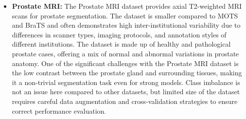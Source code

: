 \documentclass{cls/iutbscthesis}
\begin{document}
\begin{itemize}
    \item \textbf{Prostate MRI:} The Prostate MRI dataset provides axial T2-weighted MRI scans for prostate segmentation. The dataset is smaller compared to MOTS and BraTS and often demonstrates high inter-institutional variability due to differences in scanner types, imaging protocols, and annotation styles of different institutions. The dataset is made up of healthy and pathological prostate cases, offering a mix of normal and abnormal variations in prostate anatomy. One of the significant challenges with the Prostate MRI dataset is the low contrast between the prostate gland and surrounding tissues, making it a non-trivial segmentation task even for strong models. Class imbalance is not an issue here compared to other datasets, but limited size of the dataset requires careful data augmentation and cross-validation strategies to ensure correct performance evaluation.
\end{itemize}




\end{document}
